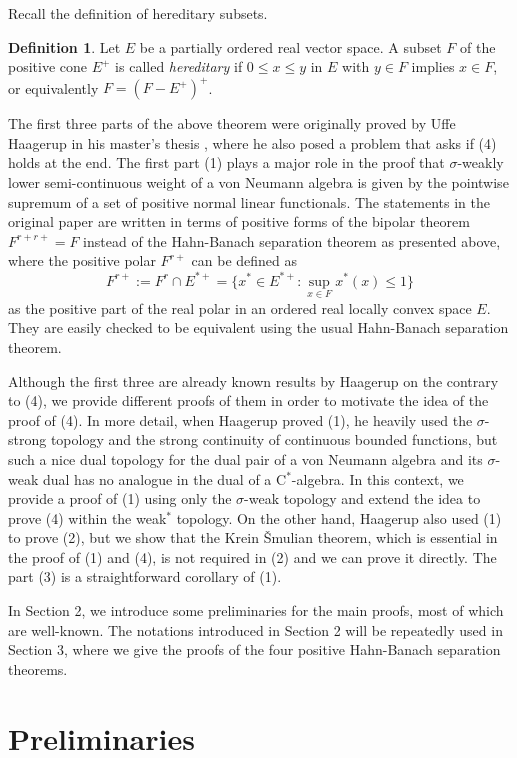 \documentclass{CUP-JNL-FMP}
\theoremstyle{plain}
\theoremstyle{definition}
\newtheorem{definition}[theorem]{Definition}
\begin{document}
Recall the definition of hereditary subsets.

\begin{definition}
Let $E$ be a partially ordered real vector space.
A subset $F$ of the positive cone $E^+$ is called \emph{hereditary} if $0\le x\le y$ in $E$ with $y\in F$ implies $x\in F$, or equivalently $F=(F-E^+)^+$.
\end{definition}

The first three parts of the above theorem were originally proved by Uffe Haagerup in his master's thesis \cite{MR380438}, where he also posed a problem that asks if (4) holds at the end.
The first part (1) plays a major role in the proof that $\sigma$-weakly lower semi-continuous weight of a von Neumann algebra is given by the pointwise supremum of a set of positive normal linear functionals.
The statements in the original paper are written in terms of positive forms of the bipolar theorem $F^{r+r+}=F$ instead of the Hahn-Banach separation theorem as presented above, where the positive polar $F^{r+}$ can be defined as
\[F^{r+}:=F^r\cap E^{*+}=\{x^*\in E^{*+}:\sup_{x\in F}x^*(x)\le1\}\]
as the positive part of the real polar in an ordered real locally convex space $E$.
They are easily checked to be equivalent using the usual Hahn-Banach separation theorem.

Although the first three are already known results by Haagerup on the contrary to (4), we provide different proofs of them in order to motivate the idea of the proof of (4).
In more detail, when Haagerup proved (1), he heavily used the $\sigma$-strong topology and the strong continuity of continuous bounded functions, but such a nice dual topology for the dual pair of a von Neumann algebra and its $\sigma$-weak dual has no analogue in the dual of a C$^*$-algebra.
In this context, we provide a proof of (1) using only the $\sigma$-weak topology and extend the idea to prove (4) within the weak$^*$ topology.
On the other hand, Haagerup also used (1) to prove (2), but we show that the Krein \v Smulian theorem, which is essential in the proof of (1) and (4), is not required in (2) and we can prove it directly.
The part (3) is a straightforward corollary of (1).

In Section 2, we introduce some preliminaries for the main proofs, most of which are well-known.
The notations introduced in Section 2 will be repeatedly used in Section 3, where we give the proofs of the four positive Hahn-Banach separation theorems.


\section{Preliminaries}
\end{document}
